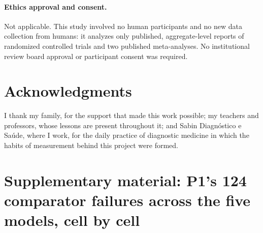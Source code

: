 \documentclass[11pt]{article}
\begin{document}
\paragraph{Ethics approval and consent.} Not applicable. This study involved no human participants and no new data collection from humans: it analyzes only published, aggregate-level reports of randomized controlled trials and two published meta-analyses. No institutional review board approval or participant consent was required.

\section*{Acknowledgments}

I thank my family, for the support that made this work possible; my teachers and professors, whose lessons are present throughout it; and Sabin Diagn\'ostico e Sa\'ude, where I work, for the daily practice of diagnostic medicine in which the habits of measurement behind this project were formed.



\clearpage
\section*{Supplementary material: P1's 124 comparator failures across the five models, cell by cell}
\renewcommand{\thetable}{S\arabic{table}}
\setcounter{table}{0}
\end{document}
